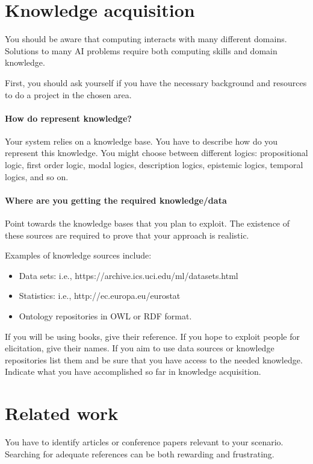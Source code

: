 \documentclass[a4paper,12pt]{report}
\begin{document}
\section{Knowledge acquisition}
You should be aware that computing interacts with many different domains. 
Solutions to many AI problems require both computing skills and domain knowledge.

First, you should ask yourself if you have the necessary background and resources to do
a project in the chosen area. 

\paragraph{How do represent knowledge?} 
Your system relies on a knowledge base.
You have to describe how do you represent this knowledge.
You might choose between different logics: 
propositional logic, first order logic, modal logics, description logics, epistemic logics, 
temporal logics, and so on. 

\paragraph{Where are you getting the required knowledge/data}
Point towards the knowledge bases that you plan to exploit. 
The existence of these sources are required to prove that your approach is realistic.

Examples of knowledge sources include:
\begin{itemize}
\item Data sets: i.e., https://archive.ics.uci.edu/ml/datasets.html 
\item Statistics: i.e., http://ec.europa.eu/eurostat 
\item Ontology repositories in OWL or RDF format.
\end{itemize}


If you will be using books, give their reference. 
If you hope to exploit people for elicitation, give their names.
If you aim to use data sources or knowledge repositories list them and be sure that you have 
access to the needed knowledge. 
Indicate what you have accomplished so far in knowledge acquisition. 




\section{Related work}
You have to identify articles or conference papers relevant to your scenario.
Searching for adequate references can be both rewarding and frustrating.
\end{document}
